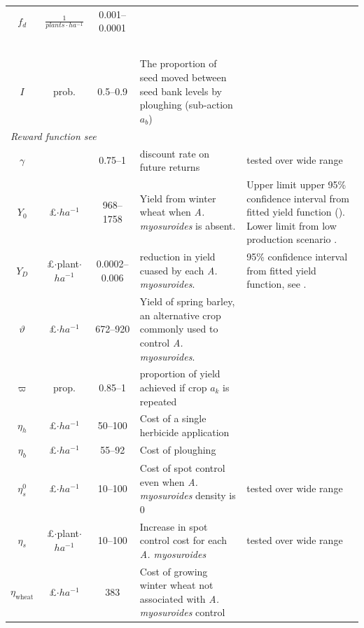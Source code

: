 \documentclass[12pt, a4paper]{article}
\begin{document}
\begin{longtable}{c c c p{5cm} p{4cm}}
	$f_d$ & $\frac{1}{plants\cdot ha^{-1}}$ & 0.001--0.0001 &  \\\\\\\\\\\\
	$I$ & prob. & 0.5--0.9 & The proportion of seed moved between seed bank levels by ploughing (sub-action $a_b$) & \citet{Grun1999} \\ 
	\multicolumn{5}{l}{\textit{Reward function see \nameref{app:Re_fun}}}\\
	$\gamma$ & & 0.75--1 & discount rate on future returns & tested over wide range\\
	$Y_0$ & \pounds $\cdot ha^{-1}$ & 968--1758 & Yield from winter wheat when \textit{A. myosuroides} is absent. & Upper limit upper 95\% confidence interval from fitted yield function (\nameref{app:Re_fun}). Lower limit from low production scenario \citet[pp.~9]{Nix2016}.\\
	$Y_D$ & \makecell[t]{\pounds$\cdot$plant$\cdot$\\$ha^{-1}$} & 0.0002--0.006 & reduction in yield cuased by each \textit{A. myosuroides}. & 95\% confidence interval from fitted yield function, see \nameref{app:Re_fun}. \\
	$\vartheta$ & \pounds$\cdot ha^{-1}$ & 672--920 & Yield of spring barley, an alternative crop commonly used to control \textit{A. myosuroides}. & \citet[pp.~12]{Nix2016}\\
	 $\varpi$ & prop. & 0.85--1 & proportion of yield achieved if crop $a_k$ is repeated & \citet[pp.~9]{Nix2016} \\
	 $\eta_h$ & \pounds$\cdot ha^{-1}$ & 50--100 & Cost of a single herbicide application & \citet[pp.~9]{Nix2016}\\
	 $\eta_b$ & \pounds$\cdot ha^{-1}$ & 55--92 & Cost of ploughing & \citet[pp.~202]{Nix2016}\\
	 $\eta_s^0$ & \pounds$\cdot ha^{-1}$ & 10--100 & Cost of spot control even when \textit{A. myosuroides} density is 0 & tested over wide range\\
	 $\eta_s$ & \makecell[t]{\pounds$\cdot$plant$\cdot$\\$ha^{-1}$} & 10--100 & Increase in spot control cost for each \textit{A. myosuroides} & tested over wide range\\
	 $\eta_\text{wheat}$ & \pounds$\cdot ha^{-1}$ & 383 & Cost of growing winter wheat not associated with \textit{A. myosuroides} control & \citet[pp.~9]{Nix2016}\\ 

\end{longtable}
\end{document}
